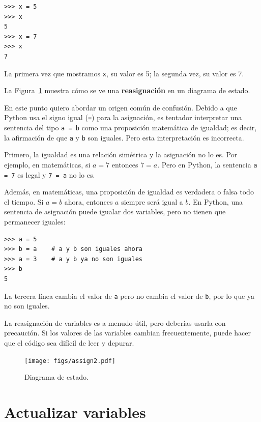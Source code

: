 \documentclass[10pt]{book}
\begin{document}
\begin{verbatim}
>>> x = 5
>>> x
5
>>> x = 7
>>> x
7
\end{verbatim}
%
La primera vez que mostramos
{\tt x}, su valor es 5; la segunda vez, su
valor es 7.

La Figura~\ref{fig.assign2} muestra cómo se ve una {\bf reasignación}
en un diagrama de estado.  

En este punto quiero abordar un origen común de
confusión.
Debido a que Python usa el signo igual ({\tt =}) para la asignación, es
tentador interpretar una sentencia del tipo {\tt a = b} como una
proposición
matemática de igualdad; es decir, la afirmación de que {\tt a} y
{\tt b} son iguales.  Pero esta interpretación es incorrecta.

Primero, la igualdad es una relación simétrica y la asignación no lo es.  Por
ejemplo, en matemáticas, si $a=7$ entonces $7=a$.  Pero en Python, la
sentencia {\tt a = 7} es legal y {\tt 7 = a} no lo es.

Además, en matemáticas, una proposición de igualdad es verdadera o
falsa todo el tiempo.  Si $a=b$ ahora, entonces $a$ siempre será igual a $b$.
En Python, una sentencia de asignación puede igualar dos variables, pero
no tienen que permanecer iguales:

\begin{verbatim}
>>> a = 5
>>> b = a    # a y b son iguales ahora
>>> a = 3    # a y b ya no son iguales
>>> b
5
\end{verbatim}
%
La tercera línea cambia el valor de {\tt a} pero no cambia el
valor de {\tt b}, por lo que ya no son iguales.

La reasignación de variables es a menudo útil, pero deberías usarla
con precaución.  Si los valores de las variables cambian frecuentemente, puede
hacer que el código sea difícil de leer y depurar.

\begin{figure}
\centerline
{\texttt{[image: figs/assign2.pdf]}}
\caption{Diagrama de estado.}
\label{fig.assign2}
\end{figure}



\section{Actualizar variables}
\label{update}

\end{document}
